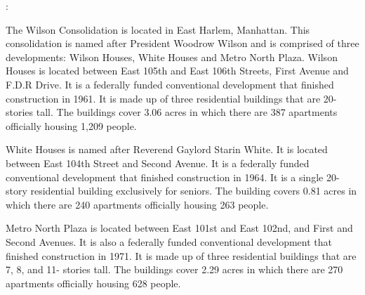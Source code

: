 :     

   

The Wilson Consolidation is located in East Harlem, Manhattan. This consolidation is named after President Woodrow Wilson and is comprised of three developments: Wilson Houses, White Houses and Metro North Plaza. Wilson Houses is located between East 105th and East 106th Streets, First Avenue and F.D.R Drive. It is a federally funded conventional development that finished construction in 1961. It is made up of three residential buildings that are 20- stories tall. The buildings cover 3.06 acres in which there are 387 apartments officially housing 1,209 people. 

White Houses is named after Reverend Gaylord Starin White. It is located between East 104th Street and Second Avenue. It is a federally funded conventional development that finished construction in 1964. It is a single 20- story residential building exclusively for seniors. The building covers 0.81 acres in which there are 240 apartments officially housing 263 people. 

Metro North Plaza is located between East 101st and East 102nd, and First and Second Avenues. It is also a federally funded conventional development that finished construction in 1971. It is made up of three residential buildings that are 7, 8, and 11- stories tall. The buildings cover 2.29 acres in which there are 270  apartments officially housing 628  people.